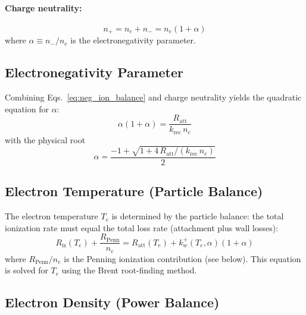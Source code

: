 \documentclass[11pt,a4paper]{article}
\newcommand{\Te}{T_e}
\newcommand{\ne}{n_e}
\begin{document}
\paragraph{Charge neutrality:}
\begin{equation}
n_+ = \ne + n_- = \ne(1 + \alpha)
\end{equation}
where $\alpha \equiv n_-/\ne$ is the electronegativity parameter.

\subsection{Electronegativity Parameter}

Combining Eqs.~\eqref{eq:neg_ion_balance} and charge neutrality yields the quadratic equation for $\alpha$:
\begin{equation}
\alpha(1+\alpha) = \frac{R_\mathrm{att}}{k_\mathrm{rec}\,\ne}
\label{eq:alpha_quadratic}
\end{equation}
with the physical root
\begin{equation}
\alpha = \frac{-1 + \sqrt{1 + 4\,R_\mathrm{att}/(k_\mathrm{rec}\,\ne)}}{2}
\end{equation}

\subsection{Electron Temperature (Particle Balance)}

The electron temperature $\Te$ is determined by the particle balance: the total ionization rate must equal the total loss rate (attachment plus wall losses):
\begin{equation}
R_\mathrm{iz}(\Te) + \frac{R_\mathrm{Penn}}{\ne} = R_\mathrm{att}(\Te) + k_w^+(\Te,\alpha)(1+\alpha)
\label{eq:Te_balance}
\end{equation}
where $R_\mathrm{Penn}/\ne$ is the Penning ionization contribution (see below).  This equation is solved for $\Te$ using the Brent root-finding method.

\subsection{Electron Density (Power Balance)}
\end{document}

